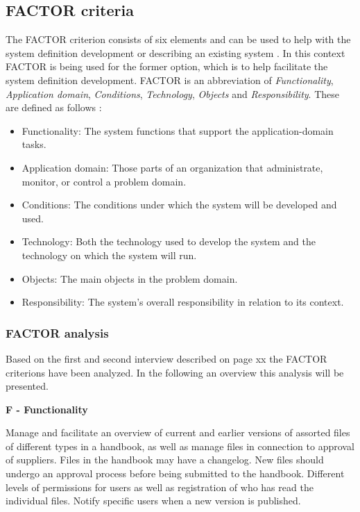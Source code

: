 \subsection{FACTOR criteria} \label{sec:factorcriteria}
The FACTOR criterion consists of six elements and can be used to help with the system definition development or describing an existing system
.
In this context FACTOR is being used for the former option, which is to help facilitate the system definition development.
FACTOR is an abbreviation of \textit{Functionality}, \textit{Application domain}, \textit{Conditions}, \textit{Technology}, \textit{Objects} and \textit{Responsibility}.
These are defined as follows \citep[p.~40]{Rod-Aalborg}:
\begin{itemize}
	\item
	 Functionality:
	 The system functions that support the application-domain tasks.
	\item
	 Application domain:
	 Those parts of an organization that administrate, monitor, or control a problem domain.
	\item
	 Conditions:
	 The conditions under which the system will be developed and used.
	\item
	 Technology:
	 Both the technology used to develop the system and the technology on which the system will run.
	\item
	 Objects:
	 The main objects in the problem domain.
	\item
	 Responsibility:
	 The system’s overall responsibility in relation to its context.
\end{itemize}

\subsubsection{FACTOR analysis}
Based on the first and second interview described on {\color{red}page xx} the FACTOR criterions have been analyzed.
In the following an overview this analysis will be presented.


\textbf{F - Functionality}\label{sec:FACTOR-functionality}

Manage and facilitate an overview of current and earlier versions of assorted files of different types in a handbook, as well as manage files in connection to approval of suppliers.
Files in the handbook may have a changelog.
New files should undergo an approval process before being submitted to the handbook.
Different levels of permissions for users as well as registration of who has read the individual files.
Notify specific users when a new version is published.

